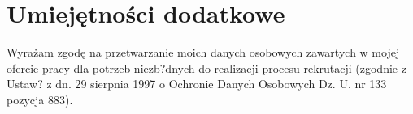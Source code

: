 \documentclass[11pt]{moderncv}
\begin{document}
\section{Umiejętności dodatkowe}


\closesection



\footnotesize
Wyrażam zgodę na przetwarzanie moich danych osobowych zawartych w mojej ofercie pracy dla potrzeb niezb?dnych do realizacji procesu rekrutacji (zgodnie z Ustaw? z dn. 29 sierpnia 1997 o Ochronie Danych Osobowych Dz. U. nr 133 pozycja 883).
\end{document}
